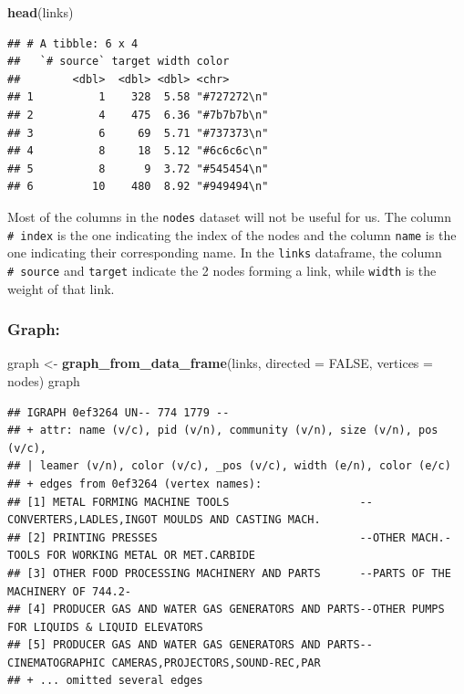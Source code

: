 \documentclass[
]{article}
\newenvironment{Shaded}{\begin{snugshade}}{\end{snugshade}}
\newcommand{\AttributeTok}[1]{\textcolor[rgb]{0.13,0.29,0.53}{#1}}
\newcommand{\ConstantTok}[1]{\textcolor[rgb]{0.56,0.35,0.01}{#1}}
\newcommand{\FunctionTok}[1]{\textcolor[rgb]{0.13,0.29,0.53}{\textbf{#1}}}
\newcommand{\NormalTok}[1]{#1}
\newcommand{\OtherTok}[1]{\textcolor[rgb]{0.56,0.35,0.01}{#1}}
\begin{document}
\begin{Shaded}
\begin{Highlighting}[]
\FunctionTok{head}\NormalTok{(links)}
\end{Highlighting}
\end{Shaded}

\begin{verbatim}
## # A tibble: 6 x 4
##   `# source` target width color      
##        <dbl>  <dbl> <dbl> <chr>      
## 1          1    328  5.58 "#727272\n"
## 2          4    475  6.36 "#7b7b7b\n"
## 3          6     69  5.71 "#737373\n"
## 4          8     18  5.12 "#6c6c6c\n"
## 5          8      9  3.72 "#545454\n"
## 6         10    480  8.92 "#949494\n"
\end{verbatim}

Most of the columns in the \texttt{nodes} dataset will not be useful for
us. The column \texttt{\#\ index} is the one indicating the index of the
nodes and the column \texttt{name} is the one indicating their
corresponding name. In the \texttt{links} dataframe, the column
\texttt{\#\ source} and \texttt{target} indicate the 2 nodes forming a
link, while \texttt{width} is the weight of that link.

\subsubsection{Graph:}\label{graph}

\begin{Shaded}
\begin{Highlighting}[]
\NormalTok{graph }\OtherTok{\textless{}{-}} \FunctionTok{graph\_from\_data\_frame}\NormalTok{(links, }\AttributeTok{directed =} \ConstantTok{FALSE}\NormalTok{, }\AttributeTok{vertices =}\NormalTok{ nodes)}
\NormalTok{graph}
\end{Highlighting}
\end{Shaded}

\begin{verbatim}
## IGRAPH 0ef3264 UN-- 774 1779 -- 
## + attr: name (v/c), pid (v/n), community (v/n), size (v/n), pos (v/c),
## | leamer (v/n), color (v/c), _pos (v/c), width (e/n), color (e/c)
## + edges from 0ef3264 (vertex names):
## [1] METAL FORMING MACHINE TOOLS                    --CONVERTERS,LADLES,INGOT MOULDS AND CASTING MACH.  
## [2] PRINTING PRESSES                               --OTHER MACH.-TOOLS FOR WORKING METAL OR MET.CARBIDE
## [3] OTHER FOOD PROCESSING MACHINERY AND PARTS      --PARTS OF THE MACHINERY OF 744.2-                  
## [4] PRODUCER GAS AND WATER GAS GENERATORS AND PARTS--OTHER PUMPS FOR LIQUIDS & LIQUID ELEVATORS        
## [5] PRODUCER GAS AND WATER GAS GENERATORS AND PARTS--CINEMATOGRAPHIC CAMERAS,PROJECTORS,SOUND-REC,PAR  
## + ... omitted several edges
\end{verbatim}
\end{document}
